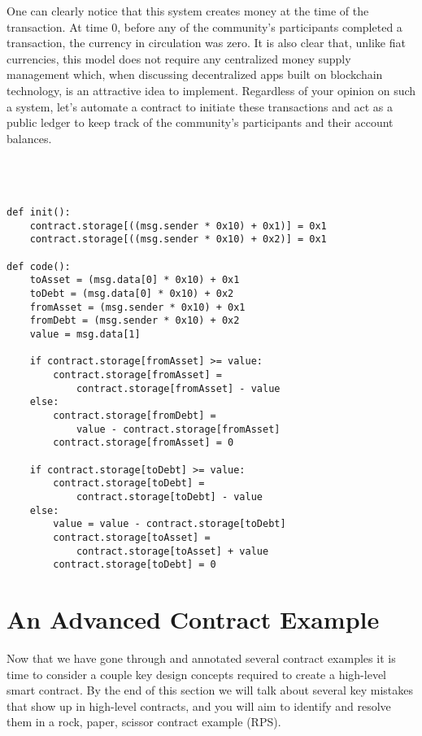 \documentclass[12pt]{article}
\begin{document}
One can clearly notice that this system creates money at the time of the transaction. At time 0, before any of the community's participants completed a transaction, the currency in circulation was zero. It is also clear that, unlike fiat currencies, this model does not require any centralized money supply management which, when discussing decentralized apps built on blockchain technology, is an attractive idea to implement. Regardless of your opinion on such a system, let's automate a contract to initiate these transactions and act as a public ledger to keep track of the community's participants and their account balances. \\
\\
\\
\\
\begin{lstlisting}[frame=single]
def init():
	contract.storage[((msg.sender * 0x10) + 0x1)] = 0x1
	contract.storage[((msg.sender * 0x10) + 0x2)] = 0x1

def code():
	toAsset = (msg.data[0] * 0x10) + 0x1
	toDebt = (msg.data[0] * 0x10) + 0x2
	fromAsset = (msg.sender * 0x10) + 0x1
	fromDebt = (msg.sender * 0x10) + 0x2
	value = msg.data[1]
	
	if contract.storage[fromAsset] >= value:
		contract.storage[fromAsset] = 
			contract.storage[fromAsset] - value 
	else:
		contract.storage[fromDebt] = 
			value - contract.storage[fromAsset]
		contract.storage[fromAsset] = 0
		
	if contract.storage[toDebt] >= value:
		contract.storage[toDebt] = 
			contract.storage[toDebt] - value
	else:
		value = value - contract.storage[toDebt] 
		contract.storage[toAsset] = 
			contract.storage[toAsset] + value
		contract.storage[toDebt] = 0
\end{lstlisting}





\section{An Advanced Contract Example}
Now that we have gone through and annotated several contract examples it is time to consider a couple key design concepts required to create a high-level smart contract. By the end of this section we will talk about several key mistakes that show up in high-level contracts, and you will aim to identify and resolve them in a rock, paper, scissor contract example (RPS).
\end{document}

